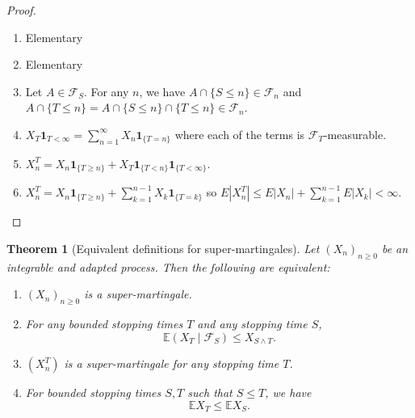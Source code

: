 \documentclass[parskip=full]{article}
\newtheorem{theorem}{Theorem}[section]
\theoremstyle{definition}
\newcommand{\1}{\mathbbm{1}}
\newcommand{\E}{\mathbb{E}}
\begin{document}
\begin{proof}
  $ $
  \begin{enumerate}
    \item Elementary
    \item Elementary
    \item Let $A \in \mathcal{F}_S$. For any $n$, we have $A \cap \{S \leq n\} \in \mathcal{F}_n$ and $A \cap \{T \leq n\} = A \cap \{S \leq n\} \cap \{T \leq n\} \in \mathcal{F}_n$.
    \item $X_T \mathbf{1}_{T < \infty} = \sum_{n=1}^\infty X_n \mathbf{1}_{\{T = n\}}$ where each of the terms is $\mathcal{F}_T$-measurable.
    \item $X^T_n = X_n \mathbf{1}_{\{T \geq n\}} + X_T \mathbf{1}_{\{T < n\}} \mathbf{1}_{\{T < \infty\}}$.
    \item $X^T_n = X_n \mathbf{1}_{\{T \geq n\}} + \sum _{k=1}^{n-1} X_k \mathbf{1}_{\{T = k\}}$ so $E |X^T_n| \leq E|X_n| + \sum_{k=1}^{n-1} E|X_k| < \infty$.
  \end{enumerate}
\end{proof}

\begin{theorem}[Equivalent definitions for super-martingales]
  Let $(X_n)_{n \geq 0}$ be an integrable and adapted process. Then the following are equivalent:
  \begin{enumerate}
    \item $(X_n)_{n \geq 0}$ is a super-martingale.
    \item For any bounded stopping times $T$ and any stopping time $S$,
      \[
        \E(X_T \mid \mathcal{F}_S) \leq X_{S \wedge T}.
      \]
    \item $(X_n^T)$ is a super-martingale for any stopping time $T$.
    \item \label{super martingale: monotone} For bounded stopping times $S, T$ such that $S \leq T$, we have
      \[
        \E X_T \leq \E X_S.
      \]
  \end{enumerate}
\end{theorem}
\end{document}
